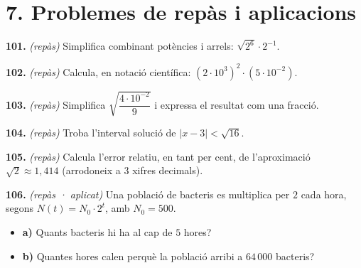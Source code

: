 \documentclass[13pt,a4paper]{extarticle}
\begin{document}
\section*{7. Problemes de repàs i aplicacions}

\par\noindent\begin{minipage}{\linewidth}
\textbf{101.} \emph{(repàs)} Simplifica combinant potències i arrels: $\sqrt{2^6}\cdot 2^{-1}$.\par
\end{minipage}\par\vspace{1.6mm}
\par\noindent\begin{minipage}{\linewidth}
\textbf{102.} \emph{(repàs)} Calcula, en notació científica: $\left(2\cdot10^3\right)^2 \cdot \left(5\cdot10^{-2}\right)$.\par
\end{minipage}\par\vspace{1.6mm}
\par\noindent\begin{minipage}{\linewidth}
\textbf{103.} \emph{(repàs)} Simplifica $\sqrt{\dfrac{4\cdot10^{-2}}{9}}$ i expressa el resultat com una fracció.\par
\end{minipage}\par\vspace{1.6mm}
\par\noindent\begin{minipage}{\linewidth}
\textbf{104.} \emph{(repàs)} Troba l'interval solució de $|x-3|<\sqrt{16}$.\par
\end{minipage}\par\vspace{1.6mm}
\par\noindent\begin{minipage}{\linewidth}
\textbf{105.} \emph{(repàs)} Calcula l'error relatiu, en tant per cent, de l'aproximació $\sqrt2 \approx 1{,}414$ (arrodoneix a $3$ xifres decimals).\par
\end{minipage}\par\vspace{1.6mm}
\par\noindent\begin{minipage}{\linewidth}
\textbf{106.} \emph{(repàs · aplicat)} Una població de bacteris es multiplica per $2$ cada hora, segons $N\left(t\right)=N_0\cdot 2^t$, amb $N_0=500$.\par

\begin{itemize}[leftmargin=0pt,itemsep=3pt,topsep=3pt,parsep=0pt,label={}]
\item \textbf{a)} Quants bacteris hi ha al cap de $5$ hores?
\item \textbf{b)} Quantes hores calen perquè la població arribi a $64\,000$ bacteris?
\end{itemize}
\end{minipage}\par\vspace{1.6mm}
\end{document}
